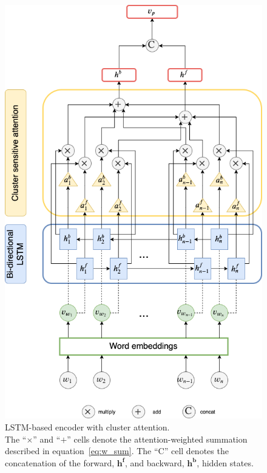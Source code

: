 \documentclass{bmcart}
\begin{document}
\begin{backmatter}
\begin{figure}[h!]
    \includegraphics[scale=0.5]{lstm.png}
    \caption{LSTM-based encoder with cluster attention. \\ The ``$\times$'' and ``$+$'' cells denote the attention-weighted summation described in equation~\ref{eq:w_sum}. The ``$\text{C}$'' cell denotes the concatenation of the forward, $\boldsymbol{h^f}$, and backward, $\boldsymbol{h^b}$, hidden states.}
    \label{fig:RNNEncoders}
\end{figure}
\pagebreak
\begin{figure}[h!]
    \centering
    \captionsetup{justification=centering}

\end{figure}
\end{backmatter}
\end{document}
